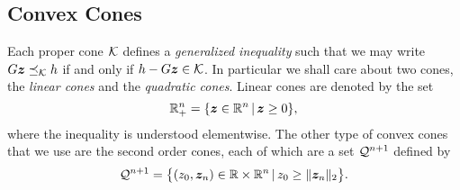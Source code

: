 \documentclass[10pt]{article}
\begin{document}
\subsection*{Convex Cones}

Each proper cone $\mathcal{K}$ defines a \textit{generalized inequality} such that we may write $G \bm{z} \preceq_{\mathcal{K}} h$ if and only if $h - G \bm{z} \in \mathcal{K}$. In particular we shall care about two cones, the \textit{linear cones} and the \textit{quadratic cones}. Linear cones are denoted by the set 
\begin{equation}
{\mathbb{R}}_+^{n} = \{ \bm{z}\in{\mathbb{R}}^n \,|\, \bm{z} \geq 0 \},
\label{eq:lcone_set}
\end{equation}
where the inequality is understood elementwise. The other type of convex cones that we use are the second order cones, each of which are a set $\mathcal{Q}^{n+1}$ defined by
\begin{equation}
\mathcal{Q}^{n+1} = \big\{ (z_0,\bm{z}_n)\in{\mathbb{R}}\times{\mathbb{R}}^n \,|\, z_0 \geq \| \bm{z}_n \|_2 \big\}.
\label{eq:soc_set}
\end{equation}
\end{document}
